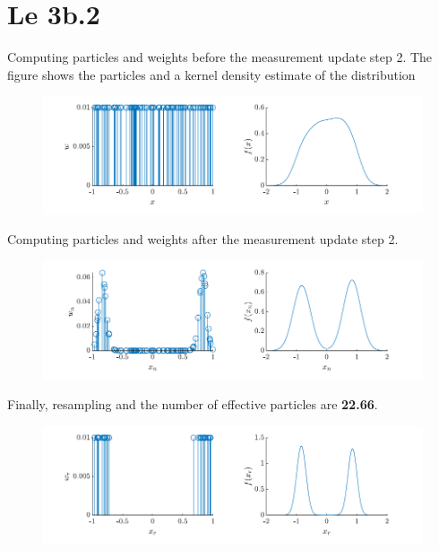 \section{Le 3b.2}
Computing particles and weights before the measurement update step 2. The figure shows the particles and a kernel density estimate of the distribution
\begin{figure}[!h]
    \centering
    \includegraphics{figures/ex4_b2a.pdf}
\end{figure}

Computing particles and weights after the measurement update step 2. 
\begin{figure}[!h]
    \centering
    \includegraphics{figures/ex4_b2b.pdf}
\end{figure}

Finally, resampling and the number of effective particles are \textbf{22.66}.
\begin{figure}[!h]
    \centering
    \includegraphics{figures/ex4_b2c.pdf}
\end{figure}